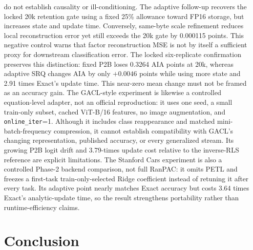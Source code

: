 \documentclass[runningheads]{llncs}
\begin{document}
do not establish causality or ill-conditioning.
The adaptive follow-up recovers the locked 20k retention gate using a fixed
25\% allowance toward FP16 storage, but increases state and update time.
Conversely, same-byte scale refinement reduces local reconstruction error yet
still exceeds the 20k gate by 0.000115 points. This negative control warns that
factor reconstruction MSE is not by itself a sufficient proxy for downstream
classification error. The locked six-replicate confirmation preserves this
distinction: fixed P2B loses 0.3264 AIA points at 20k, whereas adaptive SRQ
changes AIA by only $+0.0046$ points while using more state and 2.91 times
Exact's update time. This near-zero mean change must not be framed as an
accuracy gain.
The GACL-style experiment is likewise a controlled equation-level adapter,
not an official reproduction: it uses one seed, a small train-only subset,
cached ViT-B/16 features, no image augmentation, and
\texttt{online\_iter}=1. Although it includes class reappearance and matched
mini-batch-frequency compression, it cannot establish compatibility with
GACL's changing representation, published accuracy, or every generalized
stream. Its growing P2B logit drift and 3.79-times update cost relative to the
inverse-RLS reference are explicit limitations.
The Stanford Cars experiment is also a controlled Phase-2 backend comparison,
not full RanPAC: it omits PETL and freezes a first-task train-only-selected
Ridge coefficient instead of retuning it after every task. Its adaptive point
nearly matches Exact accuracy but costs 3.64 times Exact's analytic-update
time, so the result strengthens portability rather than runtime-efficiency
claims.

\section{Conclusion}
\end{document}
